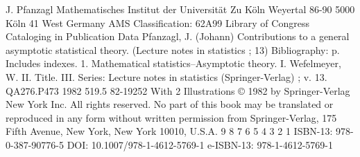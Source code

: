  J. Pfanzagl Mathematisches Institut der Universität Zu Köln Weyertal 86-90 5000 Köln 41 West Germany AMS Classification: 62A99 Library of Congress Cataloging in Publication Data Pfanzagl, J. (Johann) Contributions to a general asymptotic statistical theory. (Lecture notes in statistics ; 13) Bibliography: p. Includes indexes. 1. Mathematical statistics--Asymptotic theory. I. Wefelmeyer, W. II. Title. III. Series: Lecture notes in statistics (Springer-Verlag) ; v. 13. QA276.P473 1982 519.5 82-19252 With 2 Illustrations © 1982 by Springer-Verlag New York Inc. All rights reserved. No part of this book may be translated or reproduced in any form without written permission from Springer-Verlag, 175 Fifth Avenue, New York, New York 10010, U.S.A. 9 8 7 6 5 4 3 2 1 ISBN-13: 978-0-387-90776-5 DOI: 10.1007/978-1-4612-5769-1 e-ISBN-13: 978-1-4612-5769-1 